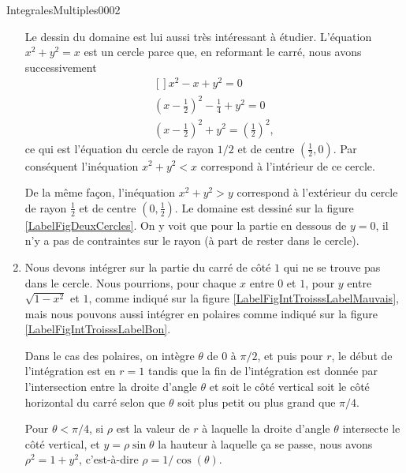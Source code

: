 \begin{corrige}{IntegralesMultiples0002}
\begin{enumerate}
			Le dessin du domaine est lui aussi très intéressant à étudier. L'équation $x^2+y^2=x$ est un cercle parce que, en reformant le carré, nous avons successivement
			\begin{equation}
				\begin{aligned}[]
					x^2-x+y^2=0\\
					\left( x-\frac{ 1 }{2} \right)^2-\frac{1}{ 4 }+y^2=0\\
					\left( x-\frac{ 1 }{2} \right)^2+y^2=\left( \frac{ 1 }{2} \right)^2,
				\end{aligned}
			\end{equation}
			ce qui est l'équation du cercle de rayon $1/2$ et de centre $(\frac{ 1 }{2},0)$. Par conséquent l'inéquation $x^2+y^2<x$ correspond à l'intérieur de ce cercle.

			\newcommand{\CaptionFigDeuxCercles}{Domaine d'intégration pour l'exercice \ref{exoIntegralesMultiples0002}.\ref{ItemexoIntegralesMultiples0002ii}.}
			

			De la même façon, l'inéquation $x^2+y^2>y$ correspond à l'extérieur du cercle de rayon $\frac{ 1 }{2}$ et de centre $(0,\frac{ 1 }{2})$. Le domaine est dessiné sur la figure \ref{LabelFigDeuxCercles}. On y voit que pour la partie en dessous de $y=0$, il n'y a pas de contraintes sur le rayon (à part de rester dans le cercle).

\newcommand{\CaptionFigIntTrois}{Domaine d'intégration pour l'exercice \ref{exoIntegralesMultiples0002}.\ref{ItemexoIntegralesMultiples0002iii}.}


		\item
			Nous devons intégrer sur la partie du carré de côté $1$ qui ne se trouve pas dans le cercle. Nous pourrions, pour chaque $x$ entre $0$ et $1$, pour $y$ entre $\sqrt{1-x^2}$ et $1$, comme indiqué sur la figure \ref{LabelFigIntTroisssLabelMauvais}, mais nous pouvons aussi intégrer en polaires comme indiqué sur la figure \ref{LabelFigIntTroisssLabelBon}.

			Dans le cas des polaires, on intègre $\theta$ de $0$ à $\pi/2$, et puis pour $r$, le début de l'intégration est en $r=1$ tandis que la fin de l'intégration est donnée par l'intersection entre la droite d'angle $\theta$ et soit le côté vertical soit le côté horizontal du carré selon que $\theta$ soit plus petit ou plus grand que $\pi/4$.

			Pour $\theta<\pi/4$, si $\rho$ est la valeur de $r$ à laquelle la droite d'angle $\theta$ intersecte le côté vertical, et $y=\rho\sin\theta$ la hauteur à laquelle ça se passe, nous avons $\rho^2=1+y^2$, c'est-à-dire $\rho=1/\cos(\theta)$.


\end{enumerate}
\end{corrige}
